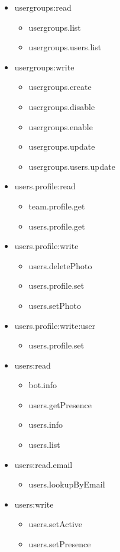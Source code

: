 \begin{multicols}{2}
\begin{itemize}
	\item usergroups:read
	\begin{itemize}
		\item usergroups.list
		\item usergroups.users.list
	\end{itemize}
	
	\item usergroups:write
	\begin{itemize}
		\item usergroups.create
		\item usergroups.disable
		\item usergroups.enable
		\item usergroups.update
		\item usergroups.users.update
	\end{itemize}
	
	\item users.profile:read
	\begin{itemize}
		\item team.profile.get
		\item users.profile.get
	\end{itemize}
	
	\item users.profile:write
	\begin{itemize}
		\item users.deletePhoto
		\item users.profile.set
		\item users.setPhoto
	\end{itemize}
	
	\item users.profile:write:user
	\begin{itemize}
		\item users.profile.set
	\end{itemize}
	
	\item users:read
	\begin{itemize}
		\item bot.info
		\item users.getPresence
		\item users.info
		\item users.list
	\end{itemize}
	
	\item users:read.email
	\begin{itemize}
		\item users.lookupByEmail
	\end{itemize}
	
	\item users:write
	\begin{itemize}
		\item users.setActive
		\item users.setPresence
	\end{itemize}
\end{itemize}
\end{multicols}

